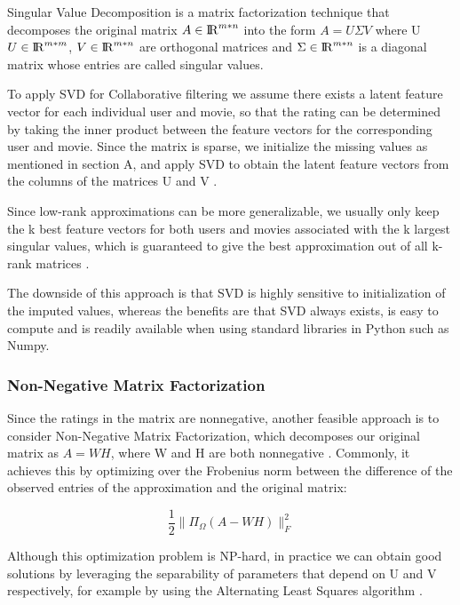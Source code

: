 \documentclass[10pt,conference,compsocconf]{IEEEtran}
\begin{document}
    Singular Value Decomposition is a matrix factorization technique that decomposes the original matrix $A \in {\rm I\!R}^{m*n} $ into the form $ A = U \Sigma V $ where U  $U \in {\rm I\!R}^{m*m}$,  $V  \in {\rm I\!R}^{m*n}$ are orthogonal matrices and $\Sigma \in {\rm I\!R}^{m*n}$ is a diagonal matrix whose entries are called singular values.   
    
    To apply SVD for Collaborative filtering we assume there exists a latent feature vector for each individual user and movie, so that the rating can be determined by taking the inner product between the feature vectors for the corresponding user and movie. Since the matrix is sparse, we initialize the missing values as mentioned in section A, and apply SVD to obtain the latent feature vectors from the columns of the matrices U and V \cite{svd}. 
    
    Since low-rank approximations can be more generalizable, we usually only keep the k best feature vectors for both users and movies associated with the k largest singular values, which is guaranteed to give the best approximation out of all k-rank matrices \cite{Eckart1936}.
    
    The downside of this approach is that SVD is highly sensitive to initialization of the imputed values, whereas the benefits are that SVD always exists, is easy to compute and is readily available when using standard libraries in Python such as Numpy.

    \subsubsection{Non-Negative Matrix Factorization}
    
    Since the ratings in the matrix are nonnegative, another feasible approach is to consider Non-Negative Matrix Factorization, which decomposes our original matrix as $A = WH$, where W and H are both nonnegative \cite{gillis2014nonnegative}. Commonly, it achieves this by optimizing over the Frobenius norm between the difference of the observed entries of the approximation and the original matrix:
    
    $$ \frac{1}{2}\|\Pi_{\Omega}(A - WH)\|^2_F$$
    
    Although this optimization problem is NP-hard, in practice we can obtain good solutions by leveraging the separability of parameters that depend on U and V respectively, for example by using the Alternating Least Squares algorithm \cite{als}.
\end{document}
